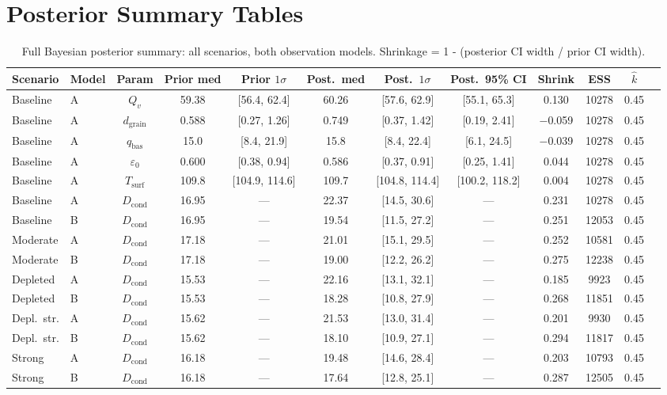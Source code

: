 \documentclass[11pt,letterpaper]{article}
\begin{document}
\section{Posterior Summary Tables}
\label{app:posterior}

\begin{landscape}
\begin{longtable}{@{}llcccccccccc@{}}
\caption{Full Bayesian posterior summary: all scenarios, both observation models. Shrinkage = 1 - (posterior CI width / prior CI width).}
\label{tab:posterior_full} \\
\toprule
\textbf{Scenario} & \textbf{Model} & \textbf{Param} & \textbf{Prior med} & \textbf{Prior $1\sigma$} & \textbf{Post.\ med} & \textbf{Post.\ $1\sigma$} & \textbf{Post.\ 95\% CI} & \textbf{Shrink} & \textbf{ESS} & $\hat{k}$ \\
\midrule
\endfirsthead
Baseline & A & $Q_v$ & 59.38 & [56.4, 62.4] & 60.26 & [57.6, 62.9] & [55.1, 65.3] & 0.130 & 10278 & 0.45 \\
Baseline & A & $d_\mathrm{grain}$ & 0.588 & [0.27, 1.26] & 0.749 & [0.37, 1.42] & [0.19, 2.41] & $-$0.059 & 10278 & 0.45 \\
Baseline & A & $q_\mathrm{bas}$ & 15.0 & [8.4, 21.9] & 15.8 & [8.4, 22.4] & [6.1, 24.5] & $-$0.039 & 10278 & 0.45 \\
Baseline & A & $\varepsilon_0$ & 0.600 & [0.38, 0.94] & 0.586 & [0.37, 0.91] & [0.25, 1.41] & 0.044 & 10278 & 0.45 \\
Baseline & A & $T_\mathrm{surf}$ & 109.8 & [104.9, 114.6] & 109.7 & [104.8, 114.4] & [100.2, 118.2] & 0.004 & 10278 & 0.45 \\
Baseline & A & $D_\mathrm{cond}$ & 16.95 & --- & 22.37 & [14.5, 30.6] & --- & 0.231 & 10278 & 0.45 \\
\midrule
Baseline & B & $D_\mathrm{cond}$ & 16.95 & --- & 19.54 & [11.5, 27.2] & --- & 0.251 & 12053 & 0.45 \\
\midrule
Moderate & A & $D_\mathrm{cond}$ & 17.18 & --- & 21.01 & [15.1, 29.5] & --- & 0.252 & 10581 & 0.45 \\
Moderate & B & $D_\mathrm{cond}$ & 17.18 & --- & 19.00 & [12.2, 26.2] & --- & 0.275 & 12238 & 0.45 \\
\midrule
Depleted & A & $D_\mathrm{cond}$ & 15.53 & --- & 22.16 & [13.1, 32.1] & --- & 0.185 & 9923 & 0.45 \\
Depleted & B & $D_\mathrm{cond}$ & 15.53 & --- & 18.28 & [10.8, 27.9] & --- & 0.268 & 11851 & 0.45 \\
\midrule
Depl.\ str. & A & $D_\mathrm{cond}$ & 15.62 & --- & 21.53 & [13.0, 31.4] & --- & 0.201 & 9930 & 0.45 \\
Depl.\ str. & B & $D_\mathrm{cond}$ & 15.62 & --- & 18.10 & [10.9, 27.1] & --- & 0.294 & 11817 & 0.45 \\
\midrule
Strong & A & $D_\mathrm{cond}$ & 16.18 & --- & 19.48 & [14.6, 28.4] & --- & 0.203 & 10793 & 0.45 \\
Strong & B & $D_\mathrm{cond}$ & 16.18 & --- & 17.64 & [12.8, 25.1] & --- & 0.287 & 12505 & 0.45 \\
\bottomrule
\end{longtable}
\end{landscape}
\end{document}
